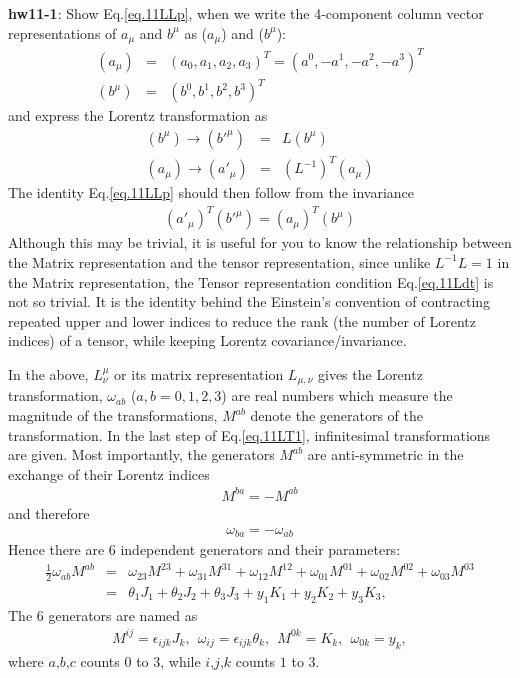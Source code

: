 \documentclass[12pt]{article}
\begin{document}
{\bf hw11-1}: Show Eq.\ref{eq.11LLp}, when we write the 4-component column vector
  representations of $a_\mu$ and $b^\mu$ as ($a_\mu$) and ($b^\mu$):
\begin{eqnarray}
  (a_\mu) &=& (a_0, a_1, a_2, a_3)^T = (a^0, -a^1, -a^2, -a^3)^T \\
  (b^\mu) &=& (b^0, b^1, b^2, b^3)^T
\end{eqnarray}
  and express the Lorentz transformation as
\begin{eqnarray}
  (b^\mu) \to ({b'}^\mu) &=&      L     (b^\mu) \\
  (a_\mu) \to ({a'}_\mu) &=& (L^{-1})^T (a_\mu)
\end{eqnarray}
   The identity Eq.\ref{eq.11LLp} should then follow from the invariance
\begin{eqnarray}
  (a'_\mu)^T (b'^\mu) = (a_\mu)^T (b^\mu)
\end{eqnarray}
  Although this may be trivial, it is useful for you to know the
  relationship between the Matrix representation and the tensor
  representation, since unlike $L^{-1} L = 1$ in the Matrix representation,
  the Tensor representation condition Eq.\ref{eq.11Ldt} is not so trivial. It is the identity behind the Einstein's convention of contracting repeated
  upper and lower indices to reduce the rank (the number of Lorentz
  indices) of a tensor, while keeping Lorentz covariance/invariance.


  In the above, $L^\mu _\nu$ or its matrix representation $L_{\mu,\nu}$ gives
  the Lorentz transformation, $\omega_{ab}$ ($a,b=0,1,2,3$) are real
  numbers which measure the magnitude of the transformations,
  $M^{ab}$ denote the generators of the transformation. In the last step
  of Eq.\ref{eq.11LT1}, infinitesimal transformations are given.  Most importantly,
  the generators $M^{ab}$ are anti-symmetric in the exchange of their
  Lorentz indices
\begin{eqnarray}
  M^{ba} = - M^{ab} \label{eq.11Mantis}
\end{eqnarray}
  and therefore
  \begin{eqnarray}
    \omega_{ba} = - \omega_{ab} \label{eq.11omeantis}
  \end{eqnarray}
 Hence there are 6 independent generators and their parameters:
\begin{eqnarray}
  \frac{1}{2} \omega_{ab} M^{ab}
  &=& \omega_{23} M^{23} +\omega_{31} M^{31} +\omega_{12} M^{12} +\omega_{01} M^{01} +\omega_{02} M^{02} +\omega_{03} M^{03} \\
  &=& \theta_1 J_1  +\theta_2 J_2  +\theta_3 J_3  +y_1 K_1  +y_2  K_2  +y_3  K_3, \label{eq.11gepara}
\end{eqnarray}
 The 6 generators are named as
\begin{eqnarray}
  M^{ij} = \epsilon_{ijk} J_k,  ~~ \omega_{ij} = \epsilon_{ijk} \theta_k, ~~ M^{0k} = K_k,  ~~              \omega_{0k} = y_k, \label{eq.11LTgener}
\end{eqnarray}
  where $a$,$b$,$c$ counts $0$ to $3$, while $i$,$j$,$k$ counts $1$ to $3$.
\end{document}
